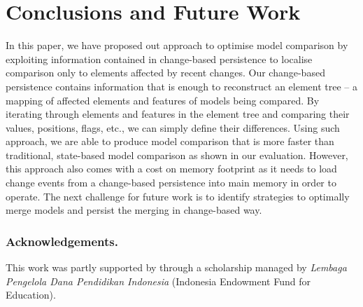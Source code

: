 \documentclass{llncs}
\begin{document}
\section{Conclusions and Future Work}
\label{sec:conclusion_and_future_work}
In this paper, we have proposed out approach to optimise model comparison by exploiting information contained in change-based persistence to localise comparison only to elements affected by recent changes. Our change-based persistence contains information that is enough to reconstruct an element tree -- a mapping of affected elements and features of models being compared. By iterating through elements and features in the element tree and comparing their values, positions, flags, etc., we can simply define their differences. Using such approach, we are able to produce model comparison that is more faster than traditional, state-based model comparison as shown in our evaluation. However, this approach also comes with a cost on memory footprint as it needs to load change events from a change-based persistence into main memory in order to operate. The next challenge for future work is to identify strategies to optimally merge models and persist the merging in change-based way. 

\vspace{-10pt}
\subsubsection*{Acknowledgements.} This work was partly supported by through a scholarship managed by \emph{Lembaga Pengelola Dana Pendidikan Indonesia} (Indonesia Endowment Fund for Education).

 

\end{document}
